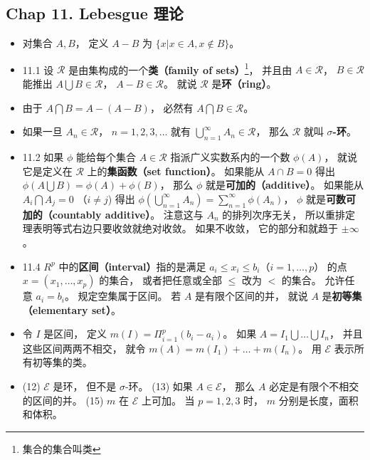 \subsection{Chap 11. Lebesgue 理论}

\begin{itemize}
\item 对集合 $A, B$， 定义 $A-B$ 为 $\{x|x\in A, x\notin B\}$。

\item 11.1 设 $\mathscr R$ 是由集构成的一个\textbf{类（family of sets）}\footnote{集合的集合叫类}， 并且由 $A\in \mathscr R$， $B\in \mathscr R$ 能推出 $A\bigcup B\in \mathscr R$， $A- B\in \mathscr R$。 就说 $\mathscr R$ 是\textbf{环（ring）}。

\item 由于 $A\bigcap B=A-(A-B)$， 必然有 $A\bigcap B\in \mathscr R$。

\item 如果一旦 $A_n\in \mathscr R$， $n=1,2,3,\dots$ 就有 $\bigcup_{n=1}^\infty A_n \in \mathscr R$， 那么 $\mathscr R$ 就叫 \textbf{$\sigma$-环}。

\item 11.2 如果 $\phi$ 能给每个集合 $A\in \mathscr R$ 指派广义实数系内的一个数 $\phi(A)$， 就说它是定义在 $\mathscr R$ 上的\textbf{集函数（set function）}。 如果能从 $A\cap B=0$ 得出 $\phi(A\bigcup B)=\phi(A)+\phi(B)$， 那么 $\phi$ 就是\textbf{可加的（additive）}。 如果能从 $A_i\bigcap A_j = 0$ （$i\ne j$) 得出 $\phi(\bigcup_{n=1}^\infty A_n) = \sum_{n=1}^\infty \phi(A_n)$， $\phi$ 就是\textbf{可数可加的（countably additive）}。 注意这与 $A_n$ 的排列次序无关， 所以重排定理表明等式右边只要收敛就绝对收敛。 如果不收敛， 它的部分和就趋于 $\pm\infty$。

\item 11.4 $R^p$ 中的\textbf{区间（interval）}指的是满足 $a_i\leqslant x_i\leqslant b_i$（$i=1,\dots,p$） 的点 $x=(x_1,\dots,x_p)$ 的集合， 或者把任意或全部 $\leqslant$ 改为 $<$ 的集合。 允许任意 $a_i=b_i$。 规定空集属于区间。 若 $A$ 是有限个区间的并， 就说 $A$ 是\textbf{初等集（elementary set）}。

\item 令 $I$ 是区间， 定义 $m(I)=\Pi_{i=1}^p (b_i-a_i)$。 如果 $A=I_1\bigcup \dots \bigcup I_n$， 并且这些区间两两不相交， 就令 $m(A)=m(I_1)+\dots+m(I_n)$。 用 $\mathscr E$ 表示所有初等集的类。

\item (12) $\mathscr E$ 是环， 但不是 $\sigma$-环。 (13) 如果 $A\in \mathscr E$， 那么 $A$ 必定是有限个不相交的区间的并。 (15) $m$ 在 $\mathscr E$ 上可加。 当 $p=1,2,3$ 时， $m$ 分别是长度，面积和体积。


\end{itemize}
